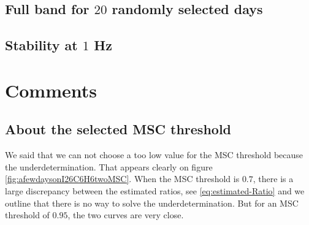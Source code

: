 



\newpage\clearpage
\subsection{Full band for $20$ randomly selected days}


\newpage\clearpage
\subsection{Stability at $1$ Hz}

\newpage\clearpage
\section{Comments}
\subsection{About the selected MSC threshold}
We said that we can not choose a too low value for the MSC threshold because the underdetermination. That appears clearly on figure \ref{fig:afewdaysonI26C6H6twoMSC}.
When the  MSC threshold is $0.7$, there is a large discrepancy between the estimated ratios, see \eqref{eq:estimated-Ratio} and we outline that there is no way to solve the underdetermination. But for an MSC threshold of $0.95$, the two curves are very close.


